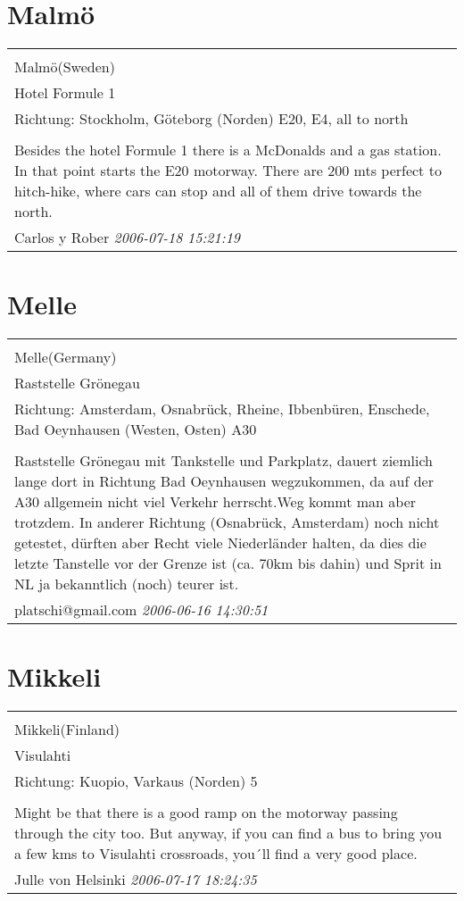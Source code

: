 \documentclass[a4paper,12pt]{article}
\begin{document}
\section{Malmö}
\begin{tabular}{|p{13cm}|}
\hline\\
Malmö(Sweden)\\
Hotel Formule 1\\
Richtung: Stockholm, Göteborg (Norden) E20, E4, all to north \\
\hline\\
Besides the hotel Formule 1 there is a McDonalds and a gas station. In that point starts the E20 motorway. There are 200 mts perfect to hitch-hike, where cars can stop and all of them drive towards the north. \\
Carlos y Rober \textit{ 2006-07-18 15:21:19 }\\\hline
\end{tabular}


\section{Melle}
\begin{tabular}{|p{13cm}|}
\hline\\
Melle(Germany)\\
Raststelle Grönegau\\
Richtung: Amsterdam, Osnabrück, Rheine, Ibbenbüren, Enschede, Bad Oeynhausen (Westen, Osten) A30 \\
\hline\\
Raststelle Grönegau mit Tankstelle und Parkplatz, dauert ziemlich lange dort in Richtung Bad Oeynhausen wegzukommen, da auf der A30 allgemein nicht viel Verkehr herrscht.Weg kommt man aber trotzdem. In anderer Richtung (Osnabrück, Amsterdam) noch nicht getestet, dürften aber Recht viele Niederländer halten, da dies die letzte Tanstelle vor der Grenze ist (ca. 70km bis dahin) und Sprit in NL ja bekanntlich (noch) teurer ist. \\
platschi@gmail.com \textit{ 2006-06-16 14:30:51 }\\\hline
\end{tabular}


\section{Mikkeli}
\begin{tabular}{|p{13cm}|}
\hline\\
Mikkeli(Finland)\\
Visulahti\\
Richtung: Kuopio, Varkaus (Norden) 5 \\
\hline\\
Might be that there is a good ramp on the motorway passing through the city too. But anyway, if you can find a bus to bring you a few kms to Visulahti crossroads, you´ll find a very good place. \\
Julle von Helsinki \textit{ 2006-07-17 18:24:35 }\\\hline
\end{tabular}
\end{document}
